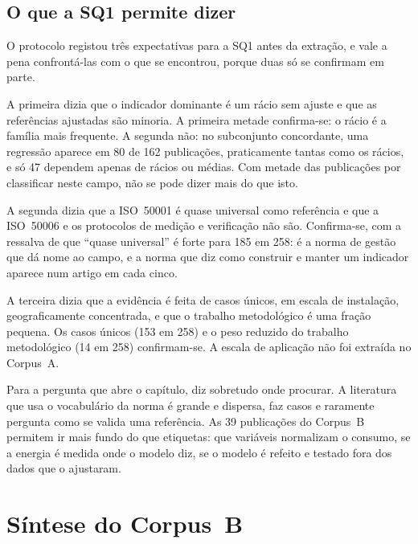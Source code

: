 \subsection{O que a SQ1 permite dizer}
\label{sec:sq1-sintese}

O protocolo registou três expectativas para a SQ1 antes da extração, e vale
a pena confrontá-las com o que se encontrou, porque duas só se confirmam em
parte.

A primeira dizia que o indicador dominante é um rácio sem ajuste e que as
referências ajustadas são minoria. A primeira metade confirma-se: o rácio é
a família mais frequente. A segunda não: no subconjunto concordante, uma
regressão aparece em 80 de 162 publicações, praticamente tantas como os
rácios, e só 47 dependem apenas de rácios ou médias. Com metade das
publicações por classificar neste campo, não se pode dizer mais do que isto.

A segunda dizia que a ISO~50001 é quase universal como referência e que a
ISO~50006 e os protocolos de medição e verificação não são. Confirma-se, com
a ressalva de que ``quase universal'' é forte para 185 em 258: é a norma de
gestão que dá nome ao campo, e a norma que diz como construir e manter um
indicador aparece num artigo em cada cinco.

A terceira dizia que a evidência é feita de casos únicos, em escala de
instalação, geograficamente concentrada, e que o trabalho metodológico é uma
fração pequena. Os casos únicos (153 em 258) e o peso reduzido do trabalho
metodológico (14 em 258) confirmam-se. A escala de aplicação não foi
extraída no Corpus~A.

Para a pergunta que abre o capítulo,  diz
sobretudo onde procurar.
A literatura que usa o vocabulário da norma é grande e dispersa, faz casos
e raramente pergunta como se valida uma referência. As 39 publicações do
Corpus~B permitem ir mais fundo do que etiquetas: que variáveis normalizam o
consumo, se a energia é medida onde o modelo diz, se o modelo é refeito e
testado fora dos dados que o ajustaram.

\section{Síntese do Corpus~B}
\label{sec:corpus-b}

